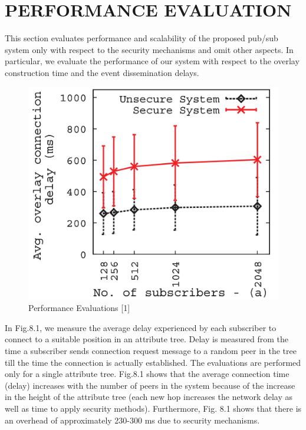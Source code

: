 \documentclass[MTech]{iitmdiss}
\begin{document}
\chapter{PERFORMANCE EVALUATION}
This section  evaluates 
performance and scalability of the proposed pub/sub
system only with respect to the security mechanisms and
omit other aspects. In particular, we evaluate the performance of our system with respect to the overlay construction time
and the event dissemination delays.\\
 \begin{figure}[htp]
\centering
\includegraphics[scale=0.6]{perf1.png}
\caption{\label{a}Performance Evaluations [1]}
\end{figure}

In Fig.8.1, we measure the average delay experienced by
each subscriber to connect to a suitable position in an
attribute tree. Delay is measured from the time a subscriber
sends connection request message to a random peer in the
tree till the time the connection is actually established. The
evaluations are performed only for a single attribute tree.
Fig.8.1 shows that the average connection time (delay)
increases with the number of peers in the system because of
the increase in the height of the attribute tree (each new hop
increases the network delay as well as time to apply
security methods). Furthermore, Fig. 8.1 shows that there is an overhead of approximately 230-300 ms due to security
mechanisms.
\end{document}

